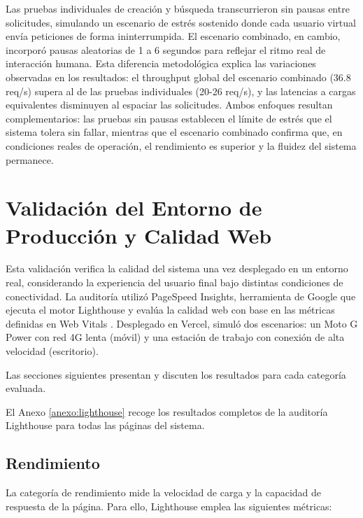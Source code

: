 Las pruebas individuales de creación y búsqueda transcurrieron sin pausas entre solicitudes, simulando un escenario de estrés sostenido donde cada usuario virtual envía peticiones de forma ininterrumpida. 
El escenario combinado, en cambio, incorporó pausas aleatorias de 1 a 6 segundos para reflejar el ritmo real de interacción humana. 
Esta diferencia metodológica explica las variaciones observadas en los resultados: el throughput global del escenario combinado (36.8 req/s) supera al de las pruebas individuales (20-26 req/s), y las latencias a cargas equivalentes disminuyen al espaciar las solicitudes.
Ambos enfoques resultan complementarios: las pruebas sin pausas establecen el límite de estrés que el sistema tolera sin fallar, mientras que el escenario combinado confirma que, en condiciones reales de operación, el rendimiento es superior y la fluidez del sistema permanece.



\section{Validación del Entorno de Producción y Calidad Web}

Esta validación verifica la calidad del sistema una vez desplegado en un entorno real, considerando la experiencia del usuario final bajo distintas condiciones de conectividad. 
La auditoría utilizó PageSpeed Insights, herramienta de Google que ejecuta el motor Lighthouse y evalúa la calidad web con base en las métricas definidas en Web Vitals \cite{googlewebdev}.
Desplegado en Vercel, simuló dos escenarios: un Moto G Power con red 4G lenta (móvil) y una estación de trabajo con conexión de alta velocidad (escritorio).

Las secciones siguientes presentan y discuten los resultados para cada categoría evaluada.

El Anexo \ref{anexo:lighthouse} recoge los resultados completos de la auditoría Lighthouse para todas las páginas del sistema.

\subsection{Rendimiento}

La categoría de rendimiento mide la velocidad de carga y la capacidad de respuesta de la página. Para ello, Lighthouse emplea las siguientes métricas:

